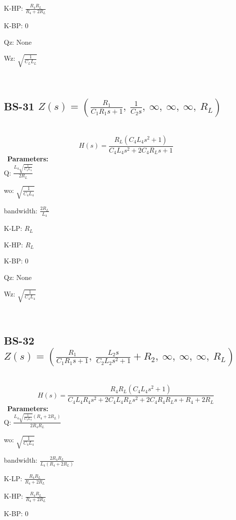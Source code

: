 \documentclass{article}
\begin{document}
K-HP: $\frac{R_{4} R_{L}}{R_{4} + 2 R_{L}}$\ 

K-BP: $0$\ 

Qz: $\text{None}$\ 

Wz: $\sqrt{\frac{1}{C_{L} L_{L}}}$\ 

\ 

\subsection{BS-31 $Z(s) = \left( \frac{R_{1}}{C_{1} R_{1} s + 1}, \  \frac{1}{C_{2} s}, \  \infty, \  \infty, \  \infty, \  R_{L}\right)$ } \ 
\textbf{\[H(s) = \frac{R_{L} \left(C_{4} L_{4} s^{2} + 1\right)}{C_{4} L_{4} s^{2} + 2 C_{4} R_{L} s + 1}\] } \ 
\textbf{Parameters:}\\ 

Q: $\frac{L_{4} \sqrt{\frac{1}{C_{4} L_{4}}}}{2 R_{L}}$\ 

wo: $\sqrt{\frac{1}{C_{4} L_{4}}}$\ 

bandwidth: $\frac{2 R_{L}}{L_{4}}$\ 

K-LP: $R_{L}$\ 

K-HP: $R_{L}$\ 

K-BP: $0$\ 

Qz: $\text{None}$\ 

Wz: $\sqrt{\frac{1}{C_{4} L_{4}}}$\ 

\ 

\subsection{BS-32 $Z(s) = \left( \frac{R_{1}}{C_{1} R_{1} s + 1}, \  \frac{L_{2} s}{C_{2} L_{2} s^{2} + 1} + R_{2}, \  \infty, \  \infty, \  \infty, \  R_{L}\right)$ } \ 
\textbf{\[H(s) = \frac{R_{4} R_{L} \left(C_{4} L_{4} s^{2} + 1\right)}{C_{4} L_{4} R_{4} s^{2} + 2 C_{4} L_{4} R_{L} s^{2} + 2 C_{4} R_{4} R_{L} s + R_{4} + 2 R_{L}}\] } \ 
\textbf{Parameters:}\\ 

Q: $\frac{L_{4} \sqrt{\frac{1}{C_{4} L_{4}}} \left(R_{4} + 2 R_{L}\right)}{2 R_{4} R_{L}}$\ 

wo: $\sqrt{\frac{1}{C_{4} L_{4}}}$\ 

bandwidth: $\frac{2 R_{4} R_{L}}{L_{4} \left(R_{4} + 2 R_{L}\right)}$\ 

K-LP: $\frac{R_{4} R_{L}}{R_{4} + 2 R_{L}}$\ 

K-HP: $\frac{R_{4} R_{L}}{R_{4} + 2 R_{L}}$\ 

K-BP: $0$\ 
\end{document}
